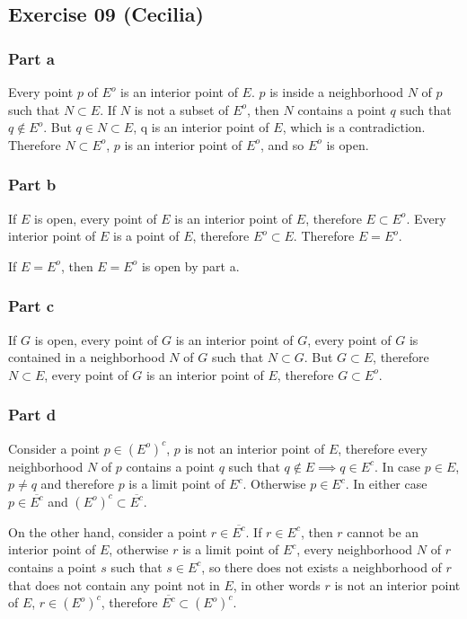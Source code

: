\subsection*{Exercise 09 (Cecilia)}
\subsubsection*{Part a}
Every point $ p $ of $ E^o $ is an interior point of $ E $.
$ p $ is inside a neighborhood $ N $ of $ p $ such that $ N \subset E $.
If $ N $ is not a subset of $ E^o $, then $ N $ contains a point $ q $ such that $ q \notin E^o $.
But $ q \in N \subset E $, q is an interior point of $ E $, which is a contradiction.
Therefore $ N \subset E^o $, $ p $ is an interior point of $ E^o $, and so $ E^o $ is open.

\subsubsection*{Part b}
If $ E $ is open, every point of $ E $ is an interior point of $ E $, therefore $ E \subset E^o $.
Every interior point of $ E $ is a point of $ E $, therefore $ E^o \subset E $.
Therefore $ E = E^o $.

If $ E = E^o $, then $ E = E^o $ is open by part a.

\subsubsection*{Part c}
If $ G $ is open, every point of $ G $ is an interior point of $ G $, every point of $ G $ is contained in a neighborhood $ N $ of $ G $ such that $ N \subset G $.
But $ G \subset E $, therefore $ N \subset E $, every point of $ G $ is an interior point of $ E $, therefore $ G \subset E^o $.

\subsubsection*{Part d}
Consider a point $ p \in (E^o)^c $, $ p $ is not an interior point of $ E $, therefore every neighborhood $ N $ of $ p $ contains a point $ q $ such that $ q \notin E \implies q \in E^c $. In case $ p \in E $, $ p \ne q $ and therefore $ p $ is a limit point of $ E^c $. Otherwise $ p \in E^c $. In either case $ p \in \overline{E^c} $ and $ (E^o)^c \subset \overline{E^c} $.

On the other hand, consider a point $ r \in \overline{E^c} $. If $ r \in E^c $, then $ r $ cannot be an interior point of $ E $, otherwise $ r $ is a limit point of $ E^c $, every neighborhood $ N $ of $ r $ contains a point $ s $ such that $ s \in E^c $, so there does not exists a neighborhood of $ r $ that does not contain any point not in $ E $, in other words $ r $ is not an interior point of $ E $, $ r \in (E^o)^c $, therefore $ \overline{E^c} \subset (E^o)^c $.

